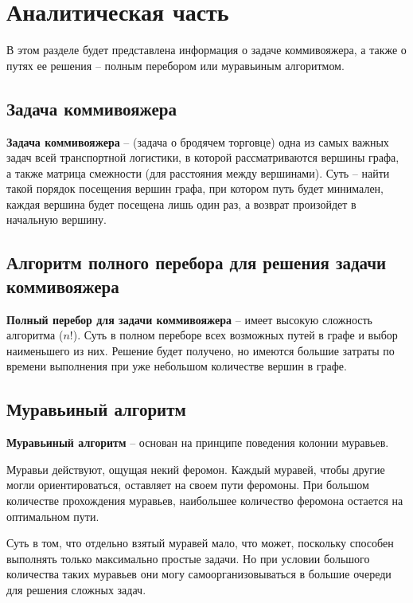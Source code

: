 \chapter{Аналитическая часть}
В этом разделе будет представлена информация о задаче коммивояжера, а также о путях ее решения -- полным перебором или муравьиным алгоритмом.


\section{Задача коммивояжера}

\textbf{Задача коммивояжера} \cite{kom-task} -- (задача о бродячем торговце) одна из самых важных задач всей транспортной логистики, в которой рассматриваются вершины графа, а также матрица смежности (для расстояния между вершинами). Суть -- найти такой порядок посещения вершин графа, при котором путь будет минимален, каждая вершина будет посещена лишь один раз, а возврат произойдет в начальную вершину.


\section{Алгоритм полного перебора для решения задачи коммивояжера}

\textbf{Полный перебор для задачи коммивояжера} \cite{kom-task-all} -- имеет высокую сложность алгоритма ($n!$). Суть в полном переборе всех возможных путей в графе и выбор наименьшего из них. Решение будет получено, но имеются большие затраты по времени выполнения при уже небольшом количестве вершин в графе.


\section{Муравьиный алгоритм}

\textbf{Муравьиный алгоритм} \cite{ant-alg} -- основан на принципе поведения колонии муравьев.

Муравьи действуют, ощущая некий феромон. Каждый муравей, чтобы другие могли ориентироваться, оставляет на своем пути феромоны. При большом количестве прохождения муравьев, наибольшее количество феромона остается на оптимальном пути.

Суть в том, что отдельно взятый муравей мало, что может, поскольку способен выполнять только максимально простые задачи. Но при условии большого количества таких муравьев они могу самоорганизовываться в большие очереди для решения сложных задач.

